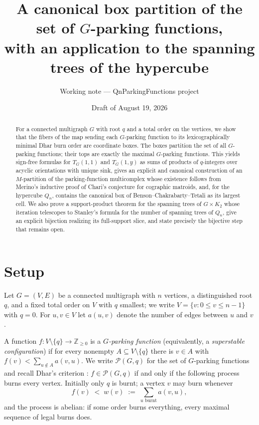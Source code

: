 \documentclass[11pt]{amsart}
\title[The canonical box partition of $G$-parking functions]{A canonical box
partition of the set of $G$-parking functions,\\ with an application to the
spanning trees of the hypercube}
\author{Working note --- QnParkingFunctions project}
\date{Draft of August 19, 2026}
\theoremstyle{definition}
\newcommand{\PF}{\mathcal{P}}
\newcommand{\ZZ}{\mathbb{Z}}
\begin{document}
\maketitle

\begin{abstract}
For a connected multigraph $G$ with root $q$ and a total order on the
vertices, we show that the fibers of the map sending each $G$-parking
function to its lexicographically minimal Dhar burn order are coordinate
boxes. The boxes partition the set of all $G$-parking functions; their tops
are exactly the maximal $G$-parking functions. This yields sign-free formulas
for $T_G(1,1)$ and $T_G(1,y)$ as sums of products of $q$-integers over
acyclic orientations with unique sink, gives an explicit and canonical
construction of an $M$-partition of the parking-function multicomplex whose
existence follows from Merino's inductive proof of Chari's conjecture for
cographic matroids, and, for the hypercube $Q_n$, contains the canonical box
of Benson--Chakrabarty--Tetali as its largest cell. We also prove a
support-product theorem for the spanning trees of $G\times K_2$ whose
iteration telescopes to Stanley's formula for the number of spanning trees
of $Q_n$, give an explicit bijection realizing its full-support slice, and
state precisely the bijective step that remains open.
\end{abstract}

\section{Setup}

Let $G=(V,E)$ be a connected multigraph with $n$ vertices, a distinguished
root $q$, and a fixed total order on $V$ with $q$ smallest; we write
$V=\{v : 0 \le v \le n-1\}$ with $q=0$. For $u,v \in V$ let $a(u,v)$ denote
the number of edges between $u$ and $v$.

A function $f\colon V\setminus\{q\} \to \ZZ_{\ge 0}$ is a
\emph{$G$-parking function} (equivalently, a \emph{superstable
configuration}) if for every nonempty $A \subseteq V\setminus\{q\}$ there is
$v\in A$ with $f(v) < \sum_{u \notin A} a(v,u)$. We write $\PF(G,q)$ for the
set of $G$-parking functions and recall Dhar's criterion
\cite{dhar,bct}: $f \in \PF(G,q)$ if and only if the following process burns
every vertex. Initially only $q$ is burnt; a vertex $v$ may burn whenever
\[
  f(v) \;<\; w(v) \;:=\; \sum_{u \text{ burnt}} a(v,u),
\]
and the process is abelian: if some order burns everything, every maximal
sequence of legal burns does.
\end{document}
